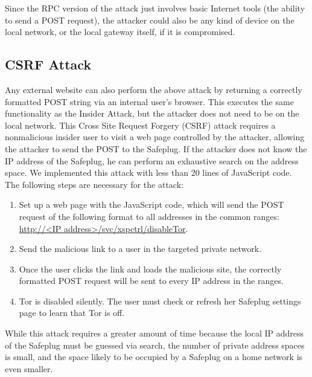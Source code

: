 \documentclass[letterpaper,twocolumn,10pt]{article}
\begin{document}
Since the RPC version of the attack just involves basic Internet tools (the ability to send a POST request), the attacker could also be any kind of device on the local network, or the local gateway itself, if it is compromised.

\subsection{CSRF Attack}
Any external website can also perform the above attack by returning a correctly formatted POST string via an internal user's browser.  This executes the same functionality as the Insider Attack, but the attacker does not need to be on the local network.  This Cross Site Request Forgery (CSRF) attack requires a nonmalicious insider user to visit a web page controlled by the attacker, allowing the attacker to send the POST to the Safeplug.  If the attacker does not know the IP address of the Safeplug, he can perform an exhaustive search on the address space.  We implemented this attack with less than 20 lines of JavaScript code.  The following steps are necessary for the attack:

\begin{enumerate} \setlength{\itemsep}{.2mm}
\item Set up a web page with the JavaScript code, which will send the POST request of the following format to all addresses in the common ranges: \url{http://<IP address>/svc/xspctrl/disableTor}.
\item Send the malicious link to a user in the targeted private network.
\item Once the user clicks the link and loads the malicious site, the correctly formatted POST request will be sent to every IP address in the ranges.  
\item Tor is disabled silently.  The user must check or refresh her Safeplug settings page to learn that Tor is off.  
\end{enumerate}  

While this attack requires a greater amount of time because the local IP address of the Safeplug must be guessed via search, the number of private address spaces is small, and the space likely to be occupied by a Safeplug on a home network is even smaller.  
\end{document}

